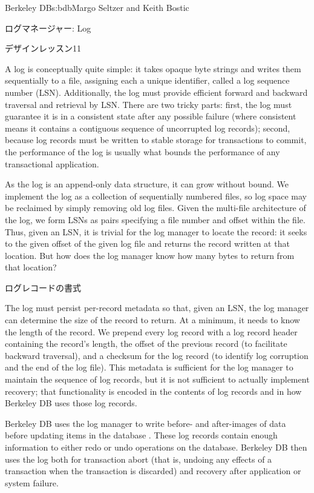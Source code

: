 \begin{aosachapter}{Berkeley DB}{s:bdb}{Margo Seltzer and Keith Bostic}
\begin{aosasect1}{ログマネージャー: Log}
\begin{aosabox}{デザインレッスン11}
\end{aosabox}

A log is conceptually quite simple: it takes opaque byte strings and
writes them sequentially to a file, assigning each a unique
identifier, called a log sequence number (LSN). Additionally, the log
must provide efficient forward and backward traversal and retrieval by
LSN\@.  There are two tricky parts: first, the log must guarantee it is
in a consistent state after any possible failure (where consistent
means it contains a contiguous sequence of uncorrupted log records);
second, because log records must be written to stable storage for
transactions to commit, the performance of the log is usually what
bounds the performance of any transactional application.

As the log is an append-only data structure, it can grow without
bound.  We implement the log as a collection of sequentially numbered
files, so log space may be reclaimed by simply removing old log
files. Given the multi-file architecture of the log, we form LSNs as
pairs specifying a file number and offset within the file. Thus, given
an LSN, it is trivial for the log manager to locate the record: it
seeks to the given offset of the given log file and returns the record
written at that location. But how does the log manager know how many
bytes to return from that location?

\begin{aosasect2}{ログレコードの書式}

The log must persist per-record metadata so that, given an LSN, the
log manager can determine the size of the record to return. At a
minimum, it needs to know the length of the record. We prepend every
log record with a log record header containing the record's length,
the offset of the previous record (to facilitate backward traversal),
and a checksum for the log record (to identify log corruption and the
end of the log file). This metadata is sufficient for the log manager
to maintain the sequence of log records, but it is not sufficient to
actually implement recovery; that functionality is encoded in the
contents of log records and in how Berkeley DB uses those log records.


Berkeley DB uses the log manager to write before- and after-images of
data before updating items in the database
\cite{bib:haerder:recovery}.  These log records contain enough
information to either redo or undo operations on the
database. Berkeley DB then uses the log both for transaction abort
(that is, undoing any effects of a transaction when the transaction is
discarded) and recovery after application or system failure.


\end{aosasect2}
\end{aosasect1}
\end{aosachapter}

